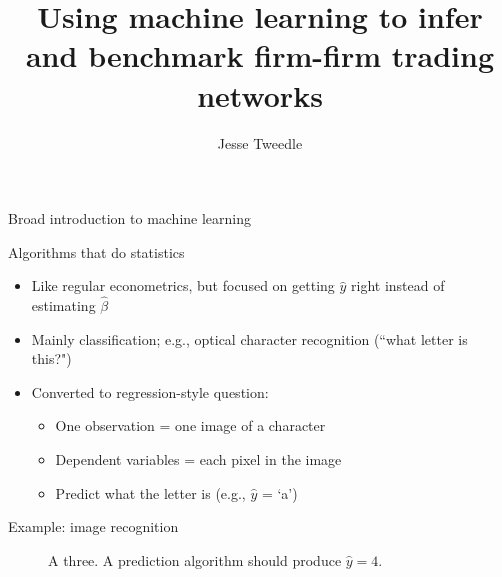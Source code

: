 \documentclass[12pt]{beamer}
\begin{document}
\title{Using machine learning to infer and benchmark firm-firm trading networks}
\author{Jesse Tweedle}

\begin{frame}{}

\maketitle

\end{frame}

\begin{frame}{Broad introduction to machine learning}

\begin{block}{Algorithms that do statistics}
\begin{itemize}
\item Like regular econometrics, but focused on getting $\hat{y}$ right instead of estimating $\hat{\beta}$
\item Mainly classification; e.g., optical character recognition (``what letter is this?")
\item Converted to regression-style question:
\begin{itemize}
\item One observation = one image of a character
\item Dependent variables = each pixel in the image
\item Predict what the letter is (e.g., $\hat{y} $ = `a')
\end{itemize}
\end{itemize}
\end{block}

\end{frame}

\begin{frame}{Example: image recognition}

\begin{figure}[h]
\caption{A three. A prediction algorithm should produce $\hat{y} = 4$.}
\centering
{}
\end{figure}

\end{frame}
\end{document}

